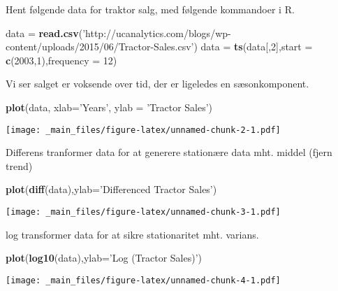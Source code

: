 \documentclass[]{book}
\newenvironment{Shaded}{\begin{snugshade}}{\end{snugshade}}
\newcommand{\DataTypeTok}[1]{\textcolor[rgb]{0.13,0.29,0.53}{#1}}
\newcommand{\DecValTok}[1]{\textcolor[rgb]{0.00,0.00,0.81}{#1}}
\newcommand{\KeywordTok}[1]{\textcolor[rgb]{0.13,0.29,0.53}{\textbf{#1}}}
\newcommand{\NormalTok}[1]{#1}
\newcommand{\StringTok}[1]{\textcolor[rgb]{0.31,0.60,0.02}{#1}}
\begin{document}
Hent følgende data for traktor salg, med følgende kommandoer i R.

\begin{Shaded}
\begin{Highlighting}[]
\NormalTok{data =}\StringTok{ }\KeywordTok{read.csv}\NormalTok{(}\StringTok{'http://ucanalytics.com/blogs/wp-content/uploads/2015/06/Tractor-Sales.csv'}\NormalTok{)}
\NormalTok{data =}\StringTok{ }\KeywordTok{ts}\NormalTok{(data[,}\DecValTok{2}\NormalTok{],}\DataTypeTok{start =} \KeywordTok{c}\NormalTok{(}\DecValTok{2003}\NormalTok{,}\DecValTok{1}\NormalTok{),}\DataTypeTok{frequency =} \DecValTok{12}\NormalTok{)}
\end{Highlighting}
\end{Shaded}

Vi ser salget er voksende over tid, der er ligeledes en sæsonkomponent.

\begin{Shaded}
\begin{Highlighting}[]
\KeywordTok{plot}\NormalTok{(data, }\DataTypeTok{xlab=}\StringTok{'Years'}\NormalTok{, }\DataTypeTok{ylab =} \StringTok{'Tractor Sales'}\NormalTok{)}
\end{Highlighting}
\end{Shaded}

\texttt{[image: \_main\_files/figure-latex/unnamed-chunk-2-1.pdf]}

Differens tranformer data for at generere stationære data mht. middel (fjern trend)

\begin{Shaded}
\begin{Highlighting}[]
\KeywordTok{plot}\NormalTok{(}\KeywordTok{diff}\NormalTok{(data),}\DataTypeTok{ylab=}\StringTok{'Differenced Tractor Sales'}\NormalTok{)}
\end{Highlighting}
\end{Shaded}

\texttt{[image: \_main\_files/figure-latex/unnamed-chunk-3-1.pdf]}

log transformer data for at sikre stationaritet mht. varians.

\begin{Shaded}
\begin{Highlighting}[]
\KeywordTok{plot}\NormalTok{(}\KeywordTok{log10}\NormalTok{(data),}\DataTypeTok{ylab=}\StringTok{'Log (Tractor Sales)'}\NormalTok{)}
\end{Highlighting}
\end{Shaded}

\texttt{[image: \_main\_files/figure-latex/unnamed-chunk-4-1.pdf]}
\end{document}
